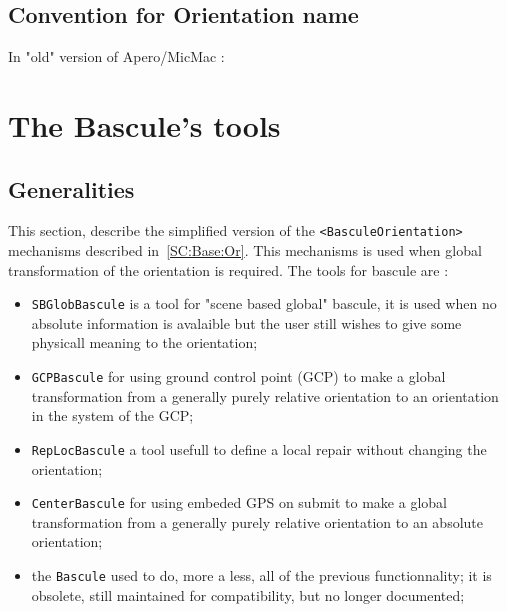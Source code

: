 \subsection{Convention for Orientation name}

In "old" version of Apero/MicMac :


\section{The Bascule's tools}

\subsection{Generalities}

\label{BASCULE}
This section, describe the simplified version of the {\tt <BasculeOrientation>} mechanisms
described in~\ref{SC:Base:Or}. This mechanisms is used when global transformation of the 
orientation is required. The tools for bascule are :

\begin{itemize}

   \item {\tt SBGlobBascule}  is a tool for "scene based global" bascule,
         it is used when no absolute information is avalaible but the user
         still wishes to give some physicall meaning to the orientation;
         
   \item {\tt GCPBascule}  for using ground control point (GCP) to make
         a global transformation from a generally purely relative orientation
         to an orientation in the system of the GCP;

   \item {\tt RepLocBascule} a tool usefull to define a local repair without
         changing the orientation;

   \item {\tt CenterBascule}  for using embeded GPS on submit  to make
         a global transformation from a generally purely relative orientation
         to an absolute orientation;

   \item   the {\tt Bascule} used to do, more a less, all of the previous 
           functionnality; it is obsolete, still maintained for compatibility,
           but no longer documented;
\end{itemize}


